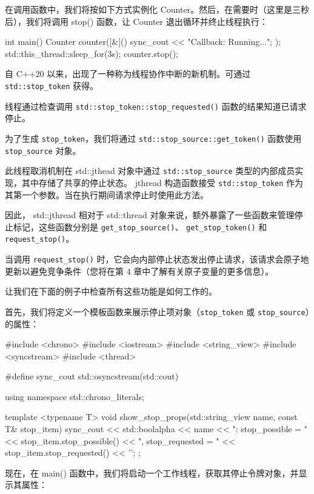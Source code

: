 在调用函数中，我们将按如下方式实例化 Counter。然后，在需要时（这里是三秒后），我们将调用 stop() 函数，让 Counter 退出循环并终止线程执行：

\begin{cpp}
int main() {
    Counter counter([&]() {
        sync_cout << "Callback: Running...\n";
    });
    std::this_thread::sleep_for(3s);
    counter.stop();
}
\end{cpp}

自 C++20 以来，出现了一种称为线程协作中断的新机制。可通过 \verb|std::stop_token| 获得。

线程通过检查调用 \verb|std::stop_token::stop_requested()| 函数的结果知道已请求停止。

为了生成 \verb|stop_token|，我们将通过 \verb|std::stop_source::get_token()| 函数使用 \verb|stop_source| 对象。

此线程取消机制在 std::jthead 对象中通过 \verb|std::stop_source| 类型的内部成员实现，其中存储了共享的停止状态。 jthread 构造函数接受 \verb|std::stop_token| 作为其第一个参数。当在执行期间请求停止时使用此方法。

因此， std::jthread 相对于 std::thread 对象来说，额外暴露了一些函数来管理停止标记，这些函数分别是 \verb|get_stop_source()|、 \verb|get_stop_token()| 和 \verb|request_stop()|。

当调用 \verb|request_stop()| 时，它会向内部停止状态发出停止请求，该请求会原子地更新以避免竞争条件（您将在第 4 章中了解有关原子变量的更多信息）。

让我们在下面的例子中检查所有这些功能是如何工作的。

首先，我们将定义一个模板函数来展示停止项对象（\verb|stop_token| 或 \verb|stop_source|）的属性：

\begin{cpp}
#include <chrono>
#include <iostream>
#include <string_view>
#include <syncstream>
#include <thread>

#define sync_cout std::osyncstream(std::cout)

using namespace std::chrono_literals;

template <typename T>
void show_stop_props(std::string_view name,
                     const T& stop_item) {
    sync_cout << std::boolalpha
              << name
              << ": stop_possible = "
              << stop_item.stop_possible()
              << ", stop_requested = "
              << stop_item.stop_requested()
              << '\n';
};
\end{cpp}

现在，在 main() 函数中，我们将启动一个工作线程，获取其停止令牌对象，并显示其属性：

